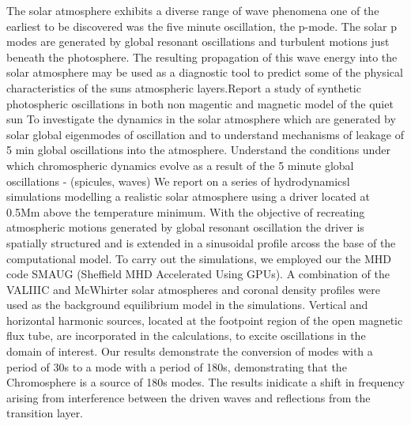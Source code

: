 \documentclass{aa}
\begin{document}
  \abstract
   { The solar atmosphere exhibits a diverse range of wave phenomena one of the earliest to be discovered was the five minute oscillation, the p-mode. The solar p modes are generated by global resonant oscillations and turbulent motions just beneath the photosphere. The resulting propagation of this wave energy into the solar atmosphere may be used as a diagnostic tool to predict some of the physical characteristics of the  suns atmospheric layers.Report a study of synthetic photospheric oscillations in both non magentic and magnetic  model of the quiet sun}
   {To investigate the dynamics in the solar atmosphere which are generated by solar global eigenmodes of oscillation and to understand mechanisms of leakage of 5 min global oscillations into the atmosphere. Understand the conditions under which chromospheric dynamics evolve as a result of the 5 minute global oscillations - (spicules, waves)
}
   {  We report on a series of hydrodynamicsl simulations modelling a realistic solar atmosphere using a driver located at 0.5Mm above the temperature minimum. With the objective of recreating atmospheric motions generated by global resonant oscillation the driver is spatially structured and is extended in a sinusoidal profile arcoss the base of the computational model.  To carry out the simulations, we employed our the MHD code SMAUG (Sheffield MHD Accelerated Using GPUs). A combination of the VALIIIC and McWhirter solar atmospheres and coronal density profiles were used as the background equilibrium
model in the simulations. Vertical and horizontal harmonic sources, located at the footpoint region of the open magnetic flux tube, are incorporated in the calculations, to excite oscillations in the domain of interest.}
   {Our results demonstrate the conversion of modes with a period of 30s to a mode with a period of 180s, demonstrating that the Chromosphere is a source of 180s modes. The results inidicate a shift in frequency arising from interference between the driven waves and reflections from the transition layer.}


   \maketitle
%
\end{document}
